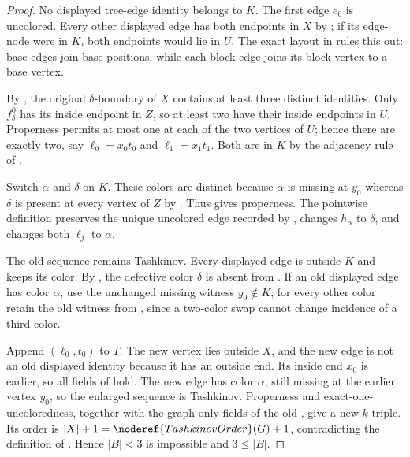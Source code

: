 \begin{proof}
No displayed tree-edge identity belongs to $K$.  The first edge $e_0$ is
uncolored.  Every other displayed edge has both endpoints in $X$ by
; if its edge-node were in $K$, both endpoints
would lie in $U$.  The exact layout in
 rules this out: base edges join
base positions, while each block edge joins its block vertex to a base
vertex.

By , the original
$\delta$-boundary of $X$ contains at least three distinct identities.
Only $f^0_\delta$ has its inside endpoint in $Z$, so at least two have
their inside endpoints in $U$.  Properness permits at most one at each of
the two vertices of $U$; hence there are exactly two, say
$\ell_0=x_0t_0$ and $\ell_1=x_1t_1$.  Both are in $K$ by the adjacency
rule of .

Switch $\alpha$ and $\delta$ on $K$.  These colors are distinct because
$\alpha$ is missing at $y_0$ whereas $\delta$ is present at every vertex
of $Z$ by .  Thus
 gives properness.  The pointwise
definition  preserves the unique
uncolored edge recorded by , changes
$h_\alpha$ to $\delta$, and changes both
$\ell_j$ to $\alpha$.

The old sequence remains Tashkinov.  Every displayed edge is outside
$K$ and keeps its color.  By , the
defective color $\delta$ is absent from .  If an
old displayed edge has color $\alpha$, use the unchanged missing witness
$y_0\notin K$; for every other color retain the old witness from
, since a two-color swap cannot change incidence
of a third color.

Append $(\ell_0,t_0)$ to $T$.  The new vertex lies outside $X$, and the
new edge is not an old displayed identity because it has an outside end.
Its inside end $x_0$ is earlier, so all fields of 
hold.  The new edge has color $\alpha$, still missing at the earlier
vertex $y_0$, so the enlarged sequence is Tashkinov.  Properness and
exact-one-uncoloredness, together with the graph-only fields of the old
, give a new $k$-triple.  Its order is
$|X|+1=\noderef{TashkinovOrder}(G)+1$, contradicting the definition of
.  Hence $|B|<3$ is impossible and $3\le|B|$.
\end{proof}
